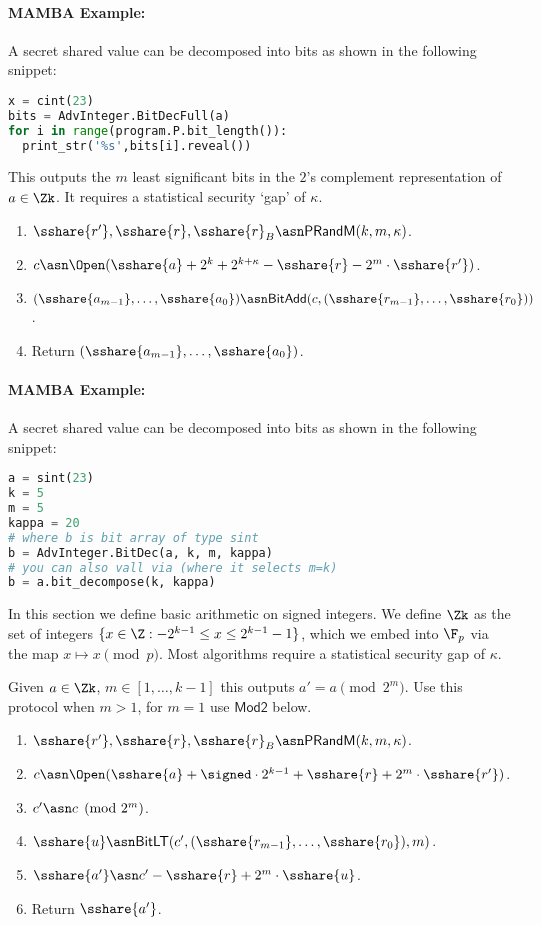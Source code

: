 \paragraph{MAMBA Example:} A secret shared value can be decomposed into bits as shown in the following snippet:
\begin{lstlisting}[language={python}]
x = cint(23)
bits = AdvInteger.BitDecFull(a)
for i in range(program.P.bit_length()):
  print_str('%s',bits[i].reveal())
\end{lstlisting}


This outputs the $m$ least significant bits in the $2$'s complement
representation of $a \in \Zk$.
It requires a statistical security `gap' of $\kappa$.
\begin{enumerate}
\item $\sshare{r'}, \sshare{r}, \sshare{r}_B \asn \mathsf{PRandM}(k,m,\kappa)$.
\item $c \asn \Open(\sshare{a}+2^k+2^{k+\kappa}-\sshare{r}-2^m \cdot \sshare{r'})$.
\item $(\sshare{a_{m-1}},\ldots,\sshare{a_0}) \asn
        \mathsf{BitAdd}(c,(\sshare{r_{m-1}},\ldots,\sshare{r_0}))$.
\item Return $(\sshare{a_{m-1}},\ldots,\sshare{a_0})$.
\end{enumerate}
\paragraph{MAMBA Example:} A secret shared value can be decomposed into bits as shown in the following snippet:
\begin{lstlisting}[language={python}]
a = sint(23)
k = 5
m = 5
kappa = 20
# where b is bit array of type sint
b = AdvInteger.BitDec(a, k, m, kappa)
# you can also vall via (where it selects m=k)
b = a.bit_decompose(k, kappa)
\end{lstlisting}

In this section we define basic arithmetic on signed integers.
We define $\Zk$ as the set of integers $\{x \in \Z: -2^{k-1} \le x \le 2^{k-1}-1\}$,
which we embed into $\F_p$ via the map $x \mapsto x \pmod{p}$.
Most algorithms require a statistical security gap of $\kappa$.


Given $a \in \Zk$, $m \in [1,\ldots,k-1]$ this outputs $a' = a \pmod{2^m}$.
Use this protocol when $m>1$, for $m=1$ use $\mathsf{Mod2}$ below.
\begin{enumerate}
\item $\sshare{r'}, \sshare{r}, \sshare{r}_B \asn \mathsf{PRandM}(k,m,\kappa)$.
\item $c \asn \Open(\sshare{a}+\signed \cdot 2^{k-1}+\sshare{r}+2^m \cdot \sshare{r'})$.
\item $c'\asn c \pmod{2^m}$.
\item $\sshare{u} \asn \mathsf{BitLT}(c',(\sshare{r_{m-1}},\ldots,\sshare{r_0}),m)$.
\item $\sshare{a'} \asn c'-\sshare{r}+2^m \cdot \sshare{u}$.
\item Return $\sshare{a'}$.
\end{enumerate}


